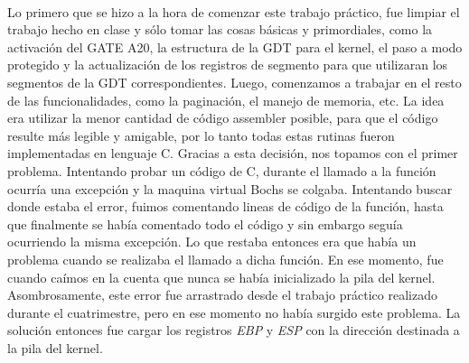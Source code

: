 \documentclass[11pt, a4paper]{article}
\begin{document}
\paragraph{}
Lo primero que se hizo a la hora de comenzar este trabajo práctico, fue limpiar el trabajo hecho en clase y sólo tomar las cosas básicas y primordiales, como la activación del GATE A20, la estructura de la GDT para el kernel, el paso a modo protegido y la actualización de los registros de segmento para que utilizaran los segmentos de la GDT correspondientes. Luego, comenzamos a trabajar en el resto de las funcionalidades, como la paginación, el manejo de memoria, etc. La idea era utilizar la menor cantidad de código assembler posible, para que el código resulte más legible y amigable, por lo tanto todas estas rutinas fueron implementadas en lenguaje C. Gracias a esta decisión, nos topamos con el primer problema. Intentando probar un código de C, durante el llamado a la función ocurría una excepción y la maquina virtual Bochs se colgaba. Intentando buscar donde estaba el error, fuimos comentando lineas de código de la función, hasta que finalmente se había comentado todo el código y sin embargo seguía ocurriendo la misma excepción. Lo que restaba entonces era que había un problema cuando se realizaba el llamado a dicha función. En ese momento, fue cuando caímos en la cuenta que nunca se había inicializado la pila del kernel. Asombrosamente, este error fue arrastrado desde el trabajo práctico realizado durante el cuatrimestre, pero en ese momento no había surgido este problema. La solución entonces fue cargar los registros \textit{EBP} y \textit{ESP} con la dirección destinada a la pila del kernel.
\end{document}
